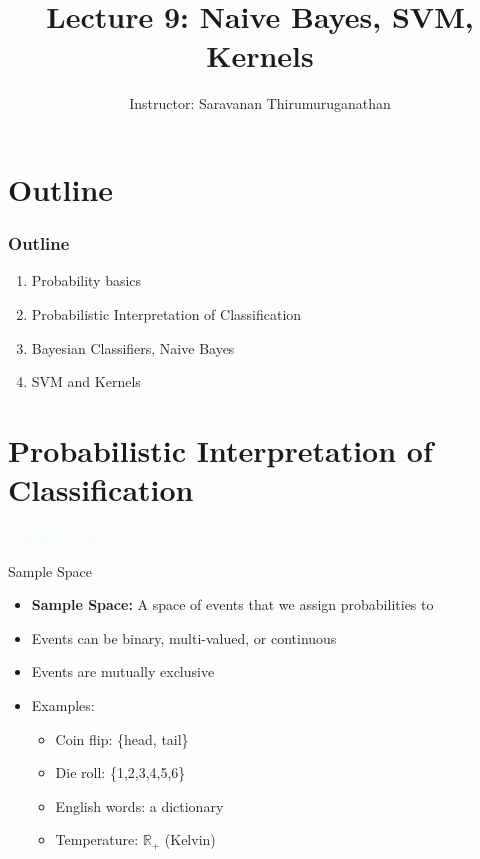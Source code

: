 \documentclass{beamer}
\title[Saravanan Thirumuruganathan] 
{Lecture 9: Naive Bayes, SVM, Kernels}
\author[CSE 5334, Data Mining] 
{Instructor: Saravanan Thirumuruganathan}
\date[]
\newcommand{\thblue}[1]{{\Huge {\textcolor{azure}{#1}}}}
\begin{document}
\begin{frame}
  \titlepage
\end{frame}


\section{Outline}

\begin{frame}
\frametitle {Outline}
    \begin{enumerate}
        \item Probability basics
        \item Probabilistic Interpretation of Classification
        \item Bayesian Classifiers, Naive Bayes
        \item SVM and Kernels
    \end{enumerate}
\end{frame}




\section{Probabilistic Interpretation of Classification}
\begin{frame}{} 
    \begin{center}
        \thblue{Probability Basics}
    \end{center}
\end{frame}


\begin{frame}{Sample Space}
    \begin{itemize}
        \item {\bf Sample Space:} A space of events that we assign probabilities to
        \item Events can be binary, multi-valued, or continuous
        \item Events are mutually exclusive
        \item Examples:
        \begin{itemize}
            \item Coin flip: \{head, tail\}
            \item Die roll: \{1,2,3,4,5,6\}
            \item English words: a dictionary
            \item Temperature: $\mathbb{R}_{+}$ (Kelvin)
        \end{itemize}
    \end{itemize}
\end{frame}
\end{document}

